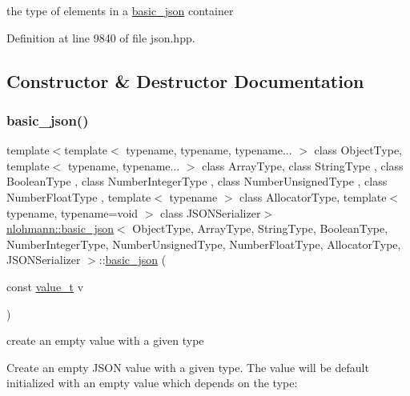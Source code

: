 the type of elements in a \hyperlink{classnlohmann_1_1basic__json}{basic\+\_\+json} container 



Definition at line 9840 of file json.\+hpp.



\subsection{Constructor \& Destructor Documentation}
\mbox{\label{classnlohmann_1_1basic__json_aed115142bd0c6c66c864700e0467df55}} 
\subsubsection{\texorpdfstring{basic\+\_\+json()}{basic\_json()}\hspace{0.1cm}{\footnotesize\ttfamily [1/9]}}
{\footnotesize\ttfamily template$<$template$<$ typename, typename, typename... $>$ class Object\+Type, template$<$ typename, typename... $>$ class Array\+Type, class String\+Type , class Boolean\+Type , class Number\+Integer\+Type , class Number\+Unsigned\+Type , class Number\+Float\+Type , template$<$ typename $>$ class Allocator\+Type, template$<$ typename, typename=void $>$ class J\+S\+O\+N\+Serializer$>$ \\
\hyperlink{classnlohmann_1_1basic__json}{nlohmann\+::basic\+\_\+json}$<$ Object\+Type, Array\+Type, String\+Type, Boolean\+Type, Number\+Integer\+Type, Number\+Unsigned\+Type, Number\+Float\+Type, Allocator\+Type, J\+S\+O\+N\+Serializer $>$\+::\hyperlink{classnlohmann_1_1basic__json}{basic\+\_\+json} (\begin{DoxyParamCaption}\item[{const \hyperlink{namespacenlohmann_1_1detail_a1ed8fc6239da25abcaf681d30ace4985}{value\+\_\+t}}]{v }\end{DoxyParamCaption})\hspace{0.3cm}{\ttfamily [inline]}}



create an empty value with a given type 

Create an empty J\+S\+ON value with a given type. The value will be default initialized with an empty value which depends on the type\+:

